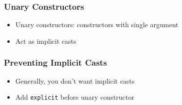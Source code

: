 \documentclass{../ucll-slides}
\begin{document}
\begin{frame}
  \frametitle{Unary Constructors}
  \begin{itemize}
    \item Unary constructors: constructors with single argument
    \item Act as implicit casts
  \end{itemize}
  \vskip5mm
  \begin{overprint}
  \end{overprint}
\end{frame}

\begin{frame}
  \frametitle{Preventing Implicit Casts}
  \begin{itemize}
    \item Generally, you don't want implicit casts
    \item Add {\tt explicit} before unary constructor
  \end{itemize}
\end{frame}
\end{document}
